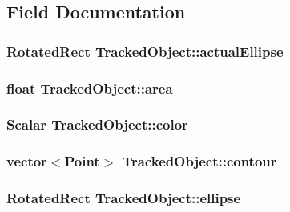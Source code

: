 \subsection{\-Field \-Documentation}
\hypertarget{classTrackedObject_a54d5e50d62b023db933ac503a69311e4}{
\subsubsection[{actual\-Ellipse}]{\setlength{\rightskip}{0pt plus 5cm}\-Rotated\-Rect {\bf \-Tracked\-Object\-::actual\-Ellipse}}}\label{classTrackedObject_a54d5e50d62b023db933ac503a69311e4}
\hypertarget{classTrackedObject_a493a4f03e1560337d4359f42ccdbb6c2}{
\subsubsection[{area}]{\setlength{\rightskip}{0pt plus 5cm}float {\bf \-Tracked\-Object\-::area}}}\label{classTrackedObject_a493a4f03e1560337d4359f42ccdbb6c2}
\hypertarget{classTrackedObject_ab9dde7b9f0950f5163a91d3d3e85c6dd}{
\subsubsection[{color}]{\setlength{\rightskip}{0pt plus 5cm}\-Scalar {\bf \-Tracked\-Object\-::color}}}\label{classTrackedObject_ab9dde7b9f0950f5163a91d3d3e85c6dd}
\hypertarget{classTrackedObject_af78a0e96f31725cd9b077d500bf69b16}{
\subsubsection[{contour}]{\setlength{\rightskip}{0pt plus 5cm}vector$<$\-Point$>$ {\bf \-Tracked\-Object\-::contour}}}\label{classTrackedObject_af78a0e96f31725cd9b077d500bf69b16}
\hypertarget{classTrackedObject_aad5c268ab9a03db41513688274f4fb2f}{
\subsubsection[{ellipse}]{\setlength{\rightskip}{0pt plus 5cm}\-Rotated\-Rect {\bf \-Tracked\-Object\-::ellipse}}}\label{classTrackedObject_aad5c268ab9a03db41513688274f4fb2f}
